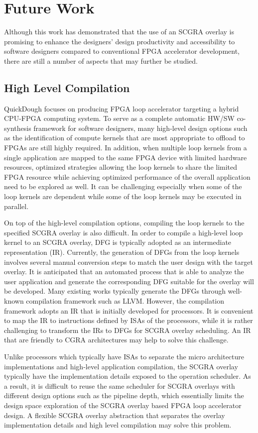\section{Future Work}
Although this work has demonstrated that the use of an SCGRA overlay is promising to enhance the designers' design productivity and accessibility to software designers compared to conventional FPGA accelerator development, there are still a number of aspects that may further be studied. 

\subsection{High Level Compilation}
QuickDough focuses on producing FPGA loop accelerator targeting a hybrid CPU-FPGA computing system. To serve as a complete automatic HW/SW co-synthesis framework for software designers, many high-level design options such as the identification of compute kernels that are most appropriate to offload to FPGAs are still highly required. In addition, when multiple loop kernels from a single application are mapped to the same FPGA device with limited hardware resources, optimized strategies allowing the loop kernels to share the limited FPGA resource while achieving optimized performance of the overall application need to be explored as well. It can be challenging especially when some of the loop kernels are dependent while some of the loop kernels may be executed in parallel.

On top of the high-level compilation options, compiling the loop kernels to the specified SCGRA overlay is also difficult. In order to compile a high-level loop kernel to an SCGRA overlay, DFG is typically adopted as an intermediate representation (IR). Currently, the generation of DFGs from the loop kernels involves several manual conversion steps to match the user design with the target overlay. It is anticipated that an automated process that is able to analyze the user application and generate the corresponding DFG suitable for the overlay will be developed. Many existing works typically generate the DFGs through well-known compilation framework such as LLVM. However, the compilation framework adopts an IR that is initially developed for processors. It is convenient to map the IR to instructions defined by ISAs of the processors, while it is rather challenging to transform the IRs to DFGs for SCGRA overlay scheduling. An IR that are friendly to CGRA architectures may help to solve this challenge.

Unlike processors which typically have ISAs to separate the micro architecture implementations and high-level application compilation, the SCGRA overlay typically have the implementation details exposed to the operation scheduler. As a result, it is difficult to reuse the same scheduler for SCGRA overlays with different design options such as the pipeline depth, which essentially limits the design space exploration of the SCGRA overlay based FPGA loop accelerator design. A flexible SCGRA overlay abstraction that separates the overlay implementation details and high level compilation may solve this problem. 

